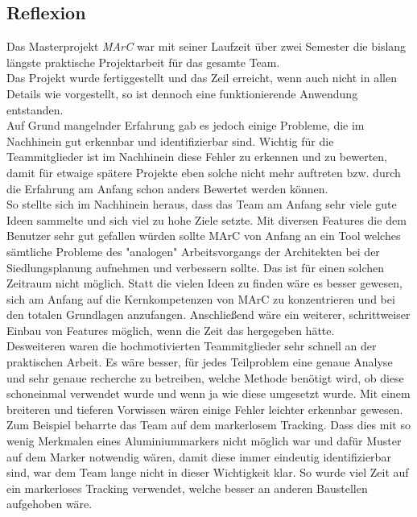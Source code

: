 \subsection{Reflexion}\label{sec:reflexion}
Das Masterprojekt \textit{MArC} war mit seiner Laufzeit über zwei Semester die bislang längste praktische Projektarbeit für das gesamte Team. \\
Das Projekt wurde fertiggestellt und das Zeil erreicht, wenn auch nicht in allen Details wie vorgestellt, so ist dennoch eine funktionierende Anwendung entstanden.\\
Auf Grund mangelnder Erfahrung gab es jedoch einige Probleme, die im Nachhinein gut erkennbar und identifizierbar sind. Wichtig für die Teammitglieder ist im Nachhinein diese Fehler zu erkennen und zu bewerten, damit für etwaige spätere Projekte eben solche nicht mehr auftreten bzw. durch die Erfahrung am Anfang schon anders Bewertet werden können.\\
So stellte sich im Nachhinein heraus, dass das Team am Anfang sehr viele gute Ideen sammelte und sich viel zu hohe Ziele setzte. Mit diversen Features die dem Benutzer sehr gut gefallen würden sollte MArC von Anfang an ein Tool welches sämtliche Probleme des "analogen" Arbeitsvorgangs der Architekten bei der Siedlungsplanung aufnehmen und verbessern sollte. Das ist für einen solchen Zeitraum nicht möglich. Statt die vielen Ideen zu finden wäre es besser gewesen, sich am Anfang auf die Kernkompetenzen von MArC zu konzentrieren und bei den totalen Grundlagen anzufangen. Anschließend wäre ein weiterer, schrittweiser Einbau von Features möglich, wenn die Zeit das hergegeben hätte.\\
Desweiteren waren die hochmotivierten Teammitglieder sehr schnell an der praktischen Arbeit. Es wäre besser, für jedes Teilproblem eine genaue Analyse und sehr genaue recherche zu betreiben, welche Methode benötigt wird, ob diese schoneinmal verwendet wurde und wenn ja wie diese umgesetzt wurde. Mit einem breiteren und tieferen Vorwissen wären einige Fehler leichter erkennbar gewesen. Zum Beispiel beharrte das Team auf dem markerlosem Tracking. Dass dies mit so wenig Merkmalen eines Aluminiummarkers nicht möglich war und dafür Muster auf dem Marker notwendig wären, damit diese immer eindeutig identifizierbar sind, war dem Team lange nicht in dieser Wichtigkeit klar. So wurde viel Zeit auf ein markerloses Tracking verwendet, welche besser an anderen Baustellen aufgehoben wäre. \\
